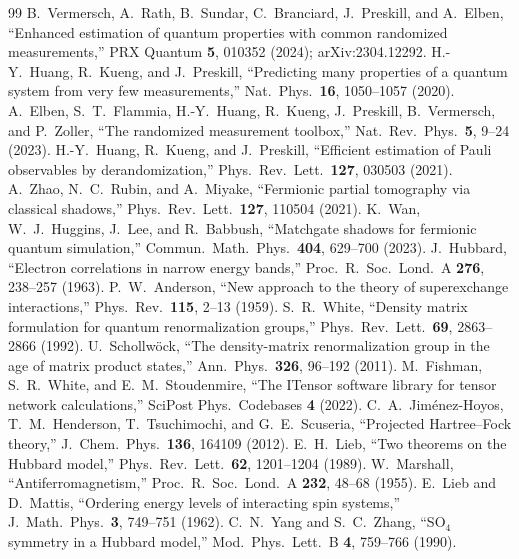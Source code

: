 \begin{thebibliography}{99}
 B.~Vermersch, A.~Rath, B.~Sundar, C.~Branciard, J.~Preskill, and A.~Elben, ``Enhanced estimation of quantum properties with common randomized measurements,'' PRX Quantum \textbf{5}, 010352 (2024); arXiv:2304.12292.
 H.-Y.~Huang, R.~Kueng, and J.~Preskill, ``Predicting many properties of a quantum system from very few measurements,'' Nat.\ Phys.\ \textbf{16}, 1050--1057 (2020).
 A.~Elben, S.~T.~Flammia, H.-Y.~Huang, R.~Kueng, J.~Preskill, B.~Vermersch, and P.~Zoller, ``The randomized measurement toolbox,'' Nat.\ Rev.\ Phys.\ \textbf{5}, 9--24 (2023).
 H.-Y.~Huang, R.~Kueng, and J.~Preskill, ``Efficient estimation of Pauli observables by derandomization,'' Phys.\ Rev.\ Lett.\ \textbf{127}, 030503 (2021).
 A.~Zhao, N.~C.~Rubin, and A.~Miyake, ``Fermionic partial tomography via classical shadows,'' Phys.\ Rev.\ Lett.\ \textbf{127}, 110504 (2021).
 K.~Wan, W.~J.~Huggins, J.~Lee, and R.~Babbush, ``Matchgate shadows for fermionic quantum simulation,'' Commun.\ Math.\ Phys.\ \textbf{404}, 629--700 (2023).
 J.~Hubbard, ``Electron correlations in narrow energy bands,'' Proc.\ R.\ Soc.\ Lond.\ A \textbf{276}, 238--257 (1963).
 P.~W.~Anderson, ``New approach to the theory of superexchange interactions,'' Phys.\ Rev.\ \textbf{115}, 2--13 (1959).
 S.~R.~White, ``Density matrix formulation for quantum renormalization groups,'' Phys.\ Rev.\ Lett.\ \textbf{69}, 2863--2866 (1992).
 U.~Schollw\"ock, ``The density-matrix renormalization group in the age of matrix product states,'' Ann.\ Phys.\ \textbf{326}, 96--192 (2011).
 M.~Fishman, S.~R.~White, and E.~M.~Stoudenmire, ``The ITensor software library for tensor network calculations,'' SciPost Phys.\ Codebases \textbf{4} (2022).
 C.~A.~Jim\'enez-Hoyos, T.~M.~Henderson, T.~Tsuchimochi, and G.~E.~Scuseria, ``Projected Hartree--Fock theory,'' J.\ Chem.\ Phys.\ \textbf{136}, 164109 (2012).
 E.~H.~Lieb, ``Two theorems on the Hubbard model,'' Phys.\ Rev.\ Lett.\ \textbf{62}, 1201--1204 (1989).
 W.~Marshall, ``Antiferromagnetism,'' Proc.\ R.\ Soc.\ Lond.\ A \textbf{232}, 48--68 (1955).
 E.~Lieb and D.~Mattis, ``Ordering energy levels of interacting spin systems,'' J.\ Math.\ Phys.\ \textbf{3}, 749--751 (1962).
 C.~N.~Yang and S.~C.~Zhang, ``SO$_4$ symmetry in a Hubbard model,'' Mod.\ Phys.\ Lett.\ B \textbf{4}, 759--766 (1990).
\end{thebibliography}

